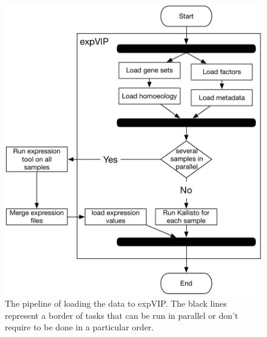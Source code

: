 \begin{figure}
\centering
\includegraphics[width=1\textwidth]{expVIP/Figures/loadDataPipeline.pdf}
\caption[expVIP load data]{The pipeline of loading the data to expVIP. The black lines represent a border of tasks that can be run in parallel or don't require to be done in a particular order.}
\label{fig:exp:loadPipeline}
\end{figure}

